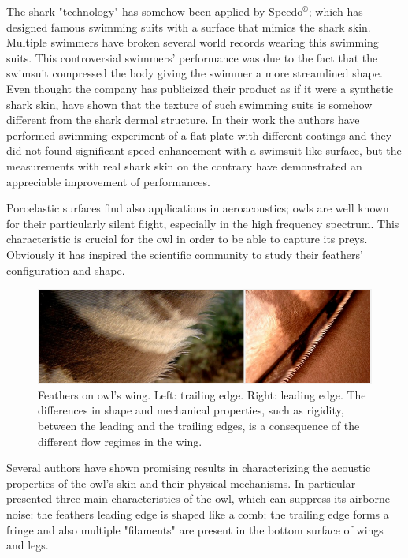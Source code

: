 The shark "technology" has somehow been applied by Speedo$^{\circledR}$; which has designed famous swimming suits with a surface that mimics the shark skin. Multiple swimmers have broken several world records wearing this swimming suits.
This controversial swimmers' performance was due to the fact that the swimsuit compressed the body giving the swimmer a more streamlined shape.
Even thought the company has publicized their product as if it were a synthetic shark skin, \citet{Oeffner785} have shown that the texture of such swimming suits is somehow different from the shark dermal structure.
In their work the authors have performed swimming experiment of a flat plate with different coatings and they did not found significant speed enhancement with a swimsuit-like surface, but the measurements with real shark skin on the contrary have demonstrated an appreciable improvement of performances.

Poroelastic surfaces find also applications in aeroacoustics; owls are well known for their particularly silent flight, especially in the high frequency spectrum.
This characteristic is crucial for the owl in order to be able to capture its preys.
Obviously it has inspired the scientific community to study their feathers' configuration and shape.

\begin{figure}[h]
	\centering
	\includegraphics[width=0.8\linewidth]{chapter_1/howl}
	\caption{Feathers on owl's wing. Left: trailing edge. Right: leading edge. The differences in shape and mechanical properties, such as rigidity, between the leading and the trailing edges, is a consequence of the different flow regimes in the wing.}
	\label{fig:owl}
\end{figure}
 
Several authors have shown promising results in characterizing the acoustic properties of the owl's skin and their physical mechanisms.
In particular \citet{lilley1998} presented three main characteristics of the owl, which can suppress its airborne noise: the feathers leading edge is shaped like a comb; the trailing edge forms a fringe and also multiple "filaments" are present in the bottom surface of wings and legs.

